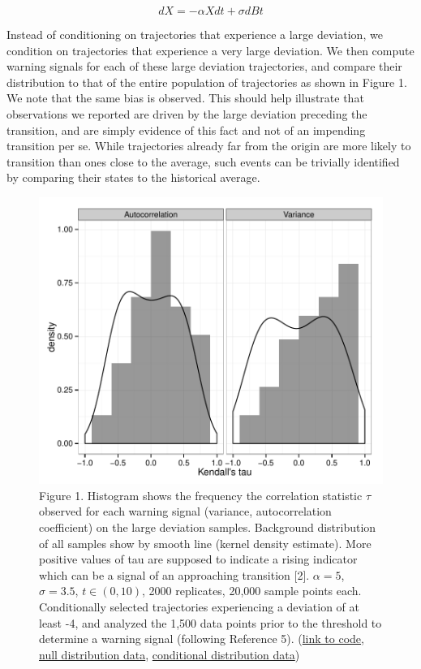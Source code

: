 \documentclass[review]{elsarticle} %
\makeatletter
\def\maxwidth{\ifdim\Gin@nat@width>\linewidth\linewidth
\else\Gin@nat@width\fi}
\let\Oldincludegraphics\includegraphics
\renewcommand{\includegraphics}[1]{\Oldincludegraphics[width=\maxwidth]{#1}}
\makeatother
\begin{document}
\[ dX = - \alpha X dt + \sigma dBt \]

Instead of conditioning on trajectories that experience a large
deviation, we condition on trajectories that experience a very large
deviation. We then compute warning signals for each of these large
deviation trajectories, and compare their distribution to that of the
entire population of trajectories as shown in Figure 1. We note that the
same bias is observed. This should help illustrate that observations we
reported are driven by the large deviation preceding the transition, and
are simply evidence of this fact and not of an impending transition per
se. While trajectories already far from the origin are more likely to
transition than ones close to the average, such events can be trivially
identified by comparing their states to the historical average.

\begin{figure}[htbp]
\centering
\includegraphics{figure1.pdf}
\caption{Figure 1. Histogram shows the frequency the correlation
statistic $\tau$ observed for each warning signal (variance,
autocorrelation coefficient) on the large deviation samples. Background
distribution of all samples show by smooth line (kernel density
estimate). More positive values of tau are supposed to indicate a rising
indicator which can be a signal of an approaching transition {[}2{]}.
$\alpha = 5$, $\sigma=3.5$, $t \in (0, 10)$, 2000 replicates, 20,000
sample points each. Conditionally selected trajectories experiencing a
deviation of at least -4, and analyzed the 1,500 data points prior to
the threshold to determine a warning signal (following Reference 5).
(\href{https://raw.github.com/cboettig/earlywarning/7460ea94c293844d8e88c83b95e3d80004817de6/inst/examples/beer.md}{link
to code},
\href{https://raw.github.com/cboettig/earlywarning/7460ea94c293844d8e88c83b95e3d80004817de6/inst/examples/beer_nulldat.csv}{null
distribution data},
\href{https://raw.github.com/cboettig/earlywarning/7460ea94c293844d8e88c83b95e3d80004817de6/inst/examples/beer_dat.csv}{conditional
distribution data})}
\end{figure}
\end{document}
